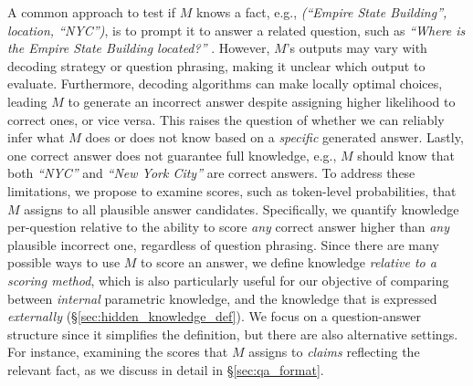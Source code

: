A common approach to test if $M$ knows a fact, e.g., {\small \textit{(``Empire State Building'', location, ``NYC'')}}, is to prompt it to answer a related question, such as {\small \textit{``Where is the Empire State Building located?''}} \citep{SimpleQA}. 
However, $M$'s outputs may vary with decoding strategy or question phrasing, making it unclear which output to evaluate. Furthermore, decoding algorithms can make locally optimal choices, leading $M$ to generate an incorrect answer despite assigning higher likelihood to correct ones, or vice versa. This raises the question of whether we can reliably infer what $M$ does or does not know based on a \textit{specific} generated answer.
Lastly, one correct answer does not guarantee full knowledge, e.g., $M$ should know that both {\small \textit{``NYC''}} and {\small \textit{``New York City''}} are correct answers.
To address these limitations, we propose to examine scores, such as token-level probabilities, that $M$ assigns to all plausible answer candidates. Specifically, we quantify knowledge per-question relative to the ability to score \textit{any} correct answer higher than \textit{any} plausible incorrect one, regardless of question phrasing. Since there are many possible ways to use $M$ to score an answer, we define knowledge \textit{relative to a scoring method}, which is also particularly useful for our objective of comparing between \textit{internal} parametric knowledge, and the knowledge that is expressed \textit{externally} (\S \ref{sec:hidden_knowledge_def}). 
We focus on a question-answer structure since it simplifies the definition, but there are also alternative settings. For instance, examining the scores that $M$ assigns to \textit{claims} reflecting the relevant fact, as we discuss in detail in \S \ref{sec:qa_format}.



